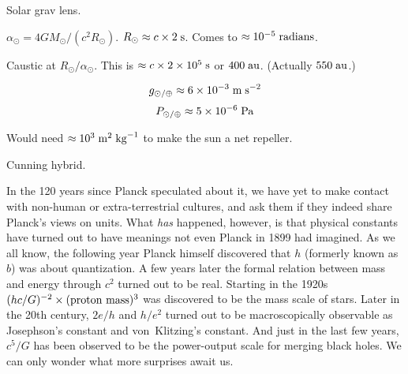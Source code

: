 \documentclass[aps,prb,12pt]{revtex4-1}
\def\unit#1{\;{\rm#1}}
\begin{document}
Solar grav lens.\cite{2020arXiv200211871T}

$\alpha_\odot=4GM_\odot/(c^2 R_\odot)$.  $R_\odot\approx
c\times2\unit{s}$.  Comes to $\approx10^{-5}\unit{radians}$.

Caustic at $R_\odot/\alpha_\odot$.  This is $\approx
c\times2\times10^5\unit{s}$ or $400\unit{au}$.  (Actually
$550\unit{au}$.)

$$ g_{\odot/\oplus} \approx 6\times10^{-3}\unit{m}\unit{s}^{-2} $$
$$ P_{\odot/\oplus} \approx 5\times10^{-6}\unit{Pa} $$

Would need $\approx 10^3\unit{m}^2\unit{kg}^{-1}$ to make the sun a
net repeller.

Cunning hybrid.

In the 120 years since Planck speculated about it, we have yet to make
contact with non-human or extra-terrestrial cultures, and ask them if
they indeed share Planck's views on units.  What {\em has} happened,
however, is that physical constants have turned out to have meanings
not even Planck in 1899 had imagined.  As we all know, the following
year Planck himself discovered that $h$ (formerly known as $b$) was
about quantization.  A few years later the formal relation between
mass and energy through $c^2$ turned out to be real.  Starting in the
1920s $(hc/G)^{-2}\times(\hbox{proton mass})^3$ was
discovered to be the mass scale of stars.  Later in the 20th century,
$2e/h$ and $h/e^2$ turned out to be macroscopically observable as
Josephson's constant and von~Klitzing's constant.  And just in the
last few years, $c^5/G$ has been observed to be the power-output scale
for merging black holes.  We can only wonder what more surprises await
us.

\def\aj{AJ}
\def\apjl{ApJL}
\def\aap{A\&A}
\def\mnras{MNRAS}
\def\pasp{PASP}



\end{document}
